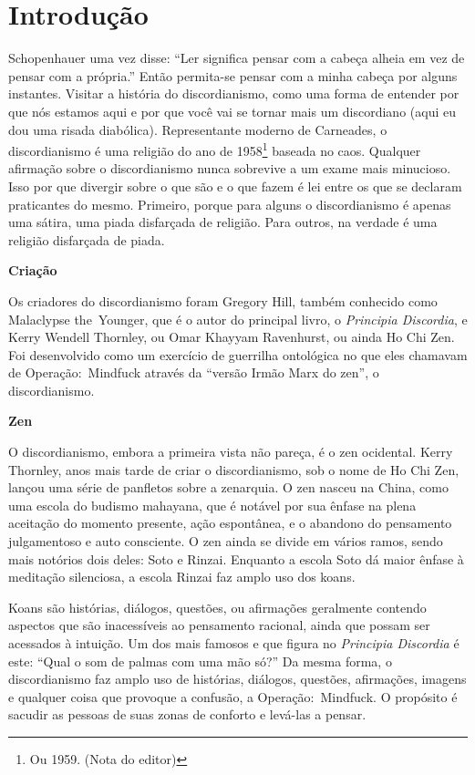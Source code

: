 \newpage
\chapter*{Introdução}

Schopenhauer uma vez disse: ``Ler significa pensar com a cabeça alheia em vez de pensar com a própria.'' Então per\-mi\-ta-se pensar com a minha cabeça por alguns instantes. Visitar a história do discordianismo, como uma forma de entender por que nós estamos aqui e por que você vai se tornar mais um discordiano (aqui eu dou uma risada diabólica). Representante moderno de Carneades, o discordianismo é uma religião do ano de 1958\footnote{Ou 1959. (Nota do editor)} baseada no caos. Qualquer afirmação sobre o discordianismo nunca sobrevive a um exame mais minucioso. Isso por que divergir sobre o que são e o que fazem é lei entre os que se declaram praticantes do mesmo. Primeiro, porque para alguns o discordianismo é apenas uma sátira, uma piada disfarçada de religião. Para outros, na verdade é uma religião disfarçada de piada.
 
\begin{flushleft}
{\Large \textbf{Criação}}
\end{flushleft}


Os criadores do discordianismo foram Gregory Hill, também conhecido como Malaclypse the~Younger, que é o autor do principal livro, o \emph{Principia Discordia}, e Kerry Wendell Thornley, ou Omar Khayyam Ravenhurst, ou ainda Ho Chi Zen. Foi desenvolvido como um exercício de guerrilha ontológica no que eles chamavam de Operação:~Mindfuck através da ``versão Irmão Marx do zen'', o discordianismo.

\begin{flushleft}
{\Large \textbf{Zen}}
\end{flushleft}

O discordianismo, embora a primeira vista não pareça, é o zen ocidental. Kerry Thornley, anos mais tarde de criar o discordianismo, sob o nome de Ho Chi Zen, lançou uma série de panfletos sobre a zenarquia. O zen nasceu na China, como uma escola do budismo mahayana, que é notável por sua ênfase na plena aceitação do momento presente, ação espontânea, e o abandono do pensamento julgamentoso e auto consciente. O zen ainda se divide em vários ramos, sendo mais notórios dois deles: Soto e Rinzai. Enquanto a escola Soto dá maior ênfase à meditação silenciosa, a escola Rinzai faz amplo uso dos koans.

Koans são histórias, diálogos, questões, ou afirmações geralmente contendo aspectos que são inacessíveis ao pensamento racional, ainda que possam ser acessados à intuição. Um dos mais famosos e que figura no \emph{Principia Discordia} é este: ``Qual o som de palmas com uma mão só?'' Da mesma forma, o discordianismo faz amplo uso de histórias, diálogos, questões, afirmações, imagens e qualquer coisa que provoque a confusão, a Operação:~Mindfuck. O propósito é sacudir as pessoas de suas zonas de conforto e levá-las a pensar.

